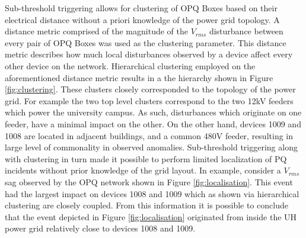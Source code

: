 Sub-threshold triggering allows for clustering of OPQ Boxes based on their electrical distance without a priori knowledge of the power grid topology.
A distance metric comprised of the magnitude of the $V_{rms}$  disturbance between every pair of OPQ Boxes was used as the clustering parameter.
This distance metric describes how much local disturbances observed by a device affect every other device on the network.
Hierarchical clustering employed on the aforementioned distance metric results in a the hierarchy shown in Figure \ref{fig:clustering}.
These clusters closely corresponded to the topology of the power grid.
For example the two top level clusters correspond to the two 12kV feeders which power the university campus.
As such, disturbances which originate on one feeder, have a minimal impact on the other.
On the other hand, devices 1009 and 1008 are located in adjacent buildings, and a common 480V feeder, resulting in large level of commonality in observed anomalies.
Sub-threshold triggering along with clustering in turn made it possible to perform limited localization of PQ incidents without prior knowledge of the grid layout.
In example, consider a $V_{rms}$ sag observed by the OPQ network shown in Figure \ref{fig:localisation}.
This event had the largest impact on devices 1008 and 1009 which as shown via hierarchical clustering are closely coupled.
From this information it is possible to conclude that the event depicted in Figure \ref{fig:localisation} originated from inside the UH power grid relatively close to devices 1008 and 1009.

